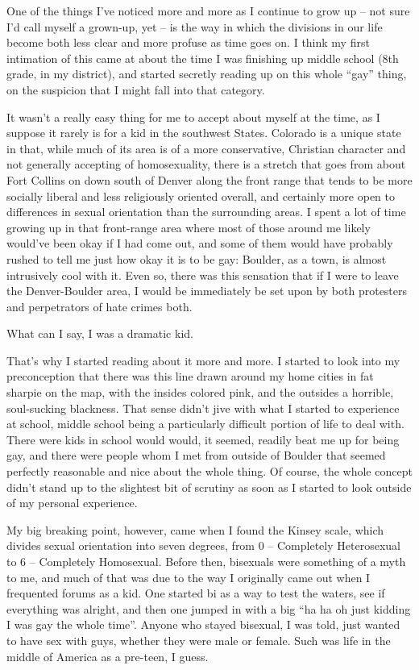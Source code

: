 
One of the things I've noticed more and more as I continue to grow up -- not sure I'd call myself a grown-up, yet -- is the way in which the divisions in our life become both less clear and more profuse as time goes on.  I think my first intimation of this came at about the time I was finishing up middle school (8th grade, in my district), and started secretly reading up on this whole ``gay'' thing, on the suspicion that I might fall into that category.

It wasn't a really easy thing for me to accept about myself at the time, as I suppose it rarely is for a kid in the southwest States.  Colorado is a unique state in that, while much of its area is of a more conservative, Christian character and not generally accepting of homosexuality, there is a stretch that goes from about Fort Collins on down south of Denver along the front range that tends to be more socially liberal and less religiously oriented overall, and certainly more open to differences in sexual orientation than the surrounding areas.  I spent a lot of time growing up in that front-range area where most of those around me likely would've been okay if I had come out, and some of them would have probably rushed to tell me just how okay it is to be gay: Boulder, as a town, is almost intrusively cool with it.  Even so, there was this sensation that if I were to leave the Denver-Boulder area, I would be immediately be set upon by both protesters and perpetrators of hate crimes both.

What can I say, I was a dramatic kid.

That's why I started reading about it more and more.  I started to look into my preconception that there was this line drawn around my home cities in fat sharpie on the map, with the insides colored pink, and the outsides a horrible, soul-sucking blackness.  That sense didn't jive with what I started to experience at school, middle school being a particularly difficult portion of life to deal with.  There were kids in school would would, it seemed, readily beat me up for being gay, and there were people whom I met from outside of Boulder that seemed perfectly reasonable and nice about the whole thing.  Of course, the whole concept didn't stand up to the slightest bit of scrutiny as soon as I started to look outside of my personal experience.

My big breaking point, however, came when I found the Kinsey scale, which divides sexual orientation into seven degrees, from 0 -- Completely Heterosexual to 6 -- Completely Homosexual.  Before then, bisexuals were something of a myth to me, and much of that was due to the way I originally came out when I frequented forums as a kid.  One started bi as a way to test the waters, see if everything was alright, and then one jumped in with a big ``ha ha oh just kidding I was gay the whole time''.  Anyone who stayed bisexual, I was told, just wanted to have sex with guys, whether they were male or female.  Such was life in the middle of America as a pre-teen, I guess.

